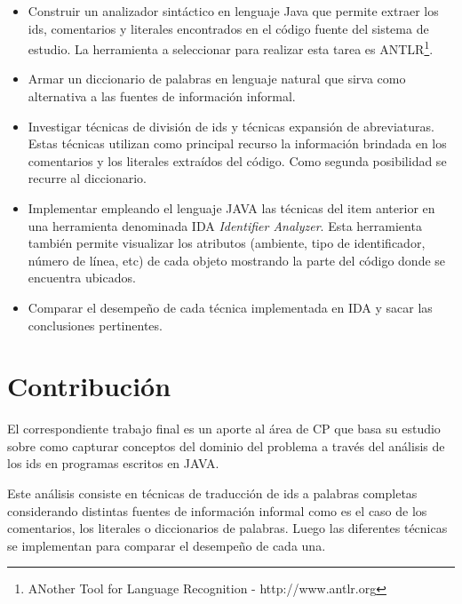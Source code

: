 \documentclass[a4paper,12pt]{report}
\begin{document}
\begin{itemize}
\itemsep0em%
\item Construir un analizador sintáctico en lenguaje Java que permite extraer los ids, comentarios y literales encontrados en el código fuente del sistema de estudio. La herramienta a seleccionar para realizar esta tarea es ANTLR\footnote[1]{ANother Tool for Language Recognition - http://www.antlr.org}.

\item Armar un diccionario de palabras en lenguaje natural que sirva como alternativa a las fuentes de información informal.

\item Investigar técnicas de división de ids y técnicas expansión de abreviaturas. Estas técnicas utilizan como principal recurso la información brindada en los comentarios y los literales extraídos del código. Como segunda posibilidad se recurre al diccionario.

\item Implementar empleando el lenguaje JAVA las técnicas del item anterior en una herramienta denominada IDA \textit{Identifier Analyzer}. Esta herramienta también permite visualizar los atributos (ambiente, tipo de identificador, número de línea, etc) de cada objeto mostrando la parte del código donde se encuentra ubicados.


\item Comparar el desempeño de cada técnica implementada en IDA y sacar las conclusiones pertinentes.

\end{itemize}

\pagebreak 
\section{Contribución}

El correspondiente trabajo final es un aporte al área de CP que basa su estudio sobre como capturar conceptos del dominio del problema a través del análisis de los ids en programas escritos en JAVA. 

Este análisis consiste en técnicas de traducción de ids a palabras completas considerando distintas fuentes de información informal como es el caso de los comentarios, los literales o diccionarios de palabras. Luego las diferentes técnicas se implementan para comparar el desempeño de cada una.
\end{document}
